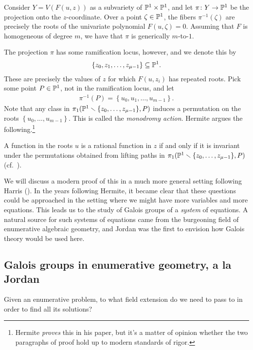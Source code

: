 \documentclass[11pt]{amsart}
\begin{document}
Consider $Y = V(F(u,z))$ as a subvariety of $\P^1 \times \P^1$, and let $\pi \colon Y \to \P^1$ be the projection onto the $z$-coordinate. Over a point $\zeta\in \P^1$, the fibers $\pi^{-1}(\zeta)$ are precisely the roots of the univariate polynomial $F(u,\zeta)=0$. Assuming that $F$ is homogeneous of degree $m$, we have that $\pi$ is generically $m$-to-$1$.

The projection $\pi$ has some ramification locus, however, and we denote this by
\begin{align*}
    \left\{ z_0, z_1, \ldots, z_{\mu-1} \right\} \subseteq \P^1.
\end{align*}
These are precisely the values of $z$ for which $F(u,z_i)$ has repeated roots. Pick some point $P \in \P^1$, not in the ramification locus, and let
\begin{align*}
    \pi^{-1}(P) = \left\{ u_0, u_1, \ldots, u_{m-1} \right\}.
\end{align*}
Note that any class in $\pi_1(\P^1\minus \{z_0, \ldots, z_{\mu-1}\},P)$ induces a permutation on the roots $\left\{ u_0, \ldots, u_{m-1} \right\}$. This is called the \textit{monodromy action}. Hermite argues the following.\footnote{Hermite \textit{proves} this in his paper, but it's a matter of opinion whether the two paragraphs of proof hold up to modern standards of rigor.}

\begin{theorem}
A function in the roots $u$ is a rational function in $z$ if and only if it is invariant under the permutations obtained from lifting paths in $\pi_1(\P^1\minus \{z_0, \ldots, z_{\mu-1}\},P)$ (cf.~\cite{Harris-Galois}).
\end{theorem}
We will discuss a modern proof of this in a much more general setting following Harris (). In the years following Hermite, it became clear that these questions could be approached in the setting where we might have more variables and more equations. This leads us to the study of Galois groups of a \textit{system} of equations. A natural source for such systems of equations came from the burgeoning field of enumerative algebraic geometry, and Jordan was the first to envision how Galois theory would be used here.

\subsection{Galois groups in enumerative geometry, a la Jordan}

\begin{question} Given an enumerative problem, to what field extension do we need to pass to in order to find all its solutions?
\end{question}
\end{document}
